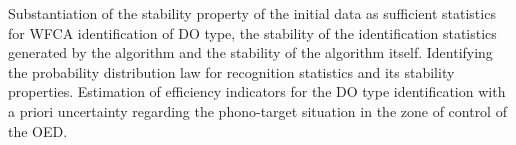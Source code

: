 Substantiation of the stability property of the initial data as sufficient statistics for WFCA identification of DO type, the stability of the identification statistics generated by the algorithm and the stability of the algorithm itself.
Identifying the probability distribution law for recognition statistics and its stability properties.
Estimation of efficiency indicators for  the DO type identification with a priori uncertainty regarding the phono-target situation in the zone of control of the OED.